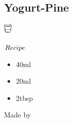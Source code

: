 \subsection{Yogurt-Pine}
\vspace{-7mm}
\hspace{40mm}
\includegraphics[width=4mm]{cocktail_glass_rock.png}
\vspace{2.5mm}
\begin{itembox}[l]{\boldmath $Recipe$}
\begin{itemize}
\setlength{\parskip}{0cm}
\setlength{\itemsep}{0cm}
\item \sake 40ml
\item \pj 20ml
\item \yogurt 2tbsp
\end{itemize}
\vspace{-4mm}
Made by \build
\end{itembox}

